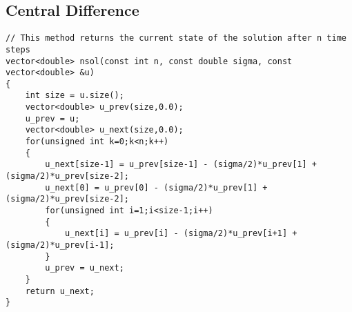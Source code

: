 \documentclass[11pt]{article}
\begin{document}
\subsection{Central Difference}
\label{sec:org3d7171f}
\begin{verbatim}
// This method returns the current state of the solution after n time steps
vector<double> nsol(const int n, const double sigma, const vector<double> &u)
{
    int size = u.size();
    vector<double> u_prev(size,0.0);
    u_prev = u;
    vector<double> u_next(size,0.0);
    for(unsigned int k=0;k<n;k++)
    {
        u_next[size-1] = u_prev[size-1] - (sigma/2)*u_prev[1] + (sigma/2)*u_prev[size-2];
        u_next[0] = u_prev[0] - (sigma/2)*u_prev[1] + (sigma/2)*u_prev[size-2];
        for(unsigned int i=1;i<size-1;i++)
        {
            u_next[i] = u_prev[i] - (sigma/2)*u_prev[i+1] + (sigma/2)*u_prev[i-1];
        }
        u_prev = u_next;
    }
    return u_next;
}
\end{verbatim}
\end{document}
